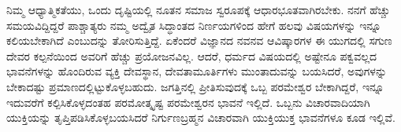 \eject


ನಿಮ್ಮ ಆಧ್ಯಾತ್ಮಿಕತೆಯು, ಒಂದು ದೃಷ್ಟಿಯಲ್ಲಿ ನೂತನ ಸಮಾಜ ಸ್ವರೂಪಕ್ಕೆ ಆಧಾರಭೂತವಾಗಿರಬೇಕು. ನನಗೆ ಹೆಚ್ಚು ಸಮಯವಿದ್ದಿದ್ದರೆ ಪಾಶ್ಚಾತ್ಯರು ನಮ್ಮ ಅದ್ವೈತ ಸಿದ್ಧಾಂತದ ನಿರ್ಣಯಗಳಿಂದ ಹೇಗೆ ಹಲವು ವಿಷಯಗಳನ್ನು ಇನ್ನೂ ಕಲಿಯಬೇಕಾಗಿದೆ ಎಂಬುದನ್ನು ತೋರಿಸುತ್ತಿದ್ದೆ. ಏಕೆಂದರೆ ವಿಜ್ಞಾನದ ನವನವ ಆವಿಷ್ಕಾರಗಳ ಈ ಯುಗದಲ್ಲಿ\- ಸಗುಣ ದೇವರ ಕಲ್ಪನೆಯಿಂದ ಅವರಿಗೆ ಹೆಚ್ಚು ಪ್ರಯೋಜನವಿಲ್ಲ. ಆದರೆ, ಧರ್ಮದ ವಿಷಯದಲ್ಲಿ ಅಷ್ಟೇನೂ ಪಕ್ವವಲ್ಲದ ಭಾವನೆಗಳನ್ನು ಹೊಂದಿರುವ ವ್ಯಕ್ತಿ ದೇವಸ್ಥಾನ, ದೇವತಾಮೂರ್ತಿಗಳು ಮುಂತಾದುವನ್ನು ಬಯಸಿದರೆ, ಅವುಗಳನ್ನು ಬೇಕಾದಷ್ಟು ಪ್ರಮಾಣದಲ್ಲಿಟ್ಟುಕೊಳ್ಳಬಹುದು. ಜಗತ್ತಿನಲ್ಲಿ ಪ್ರೀತಿಸುವುದಕ್ಕೆ ಒಬ್ಬ ಪರಮೇಶ್ವರ ಬೇಕಾಗಿದ್ದರೆ, ಇನ್ನೂ ಇದುವರೆಗೆ ಕಲ್ಪಿಸಿಕೊಳ್ಳದಂತಹ ಪರಮೋತ್ಕೃಷ್ಟ ಪರಮೇಶ್ವರನ ಭಾವನೆ ಇಲ್ಲಿದೆ. ಒಬ್ಬನು ವಿಚಾರವಾದಿಯಾಗಿ ಯುಕ್ತಿಯನ್ನು ತೃಪ್ತಿಪಡಿಸಿಕೊಳ್ಳಬಯಸಿದರೆ ನಿರ್ಗುಣ\break ಬ್ರಹ್ಮನ ವಿಚಾರವಾಗಿ ಯುಕ್ತಿಯುಕ್ತ ಭಾವನೆಗಳೂ ಕೂಡ ಇಲ್ಲಿವೆ.

